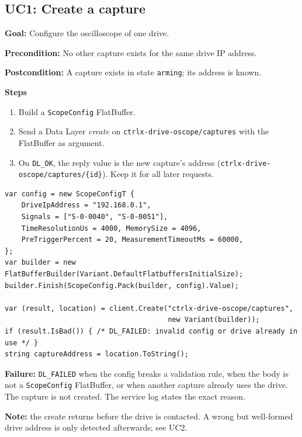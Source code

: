 \documentclass[11pt,a4paper]{article}
\newcommand{\dl}[1]{\texttt{#1}}
\newcommand{\capsroot}{\dl{ctrlx-drive-oscope/captures}}
\newcommand{\res}[1]{\texttt{#1}}
\newenvironment{usecase}[1]
  {\subsection{#1}}
  {}
\newcommand{\ucfield}[2]{\par\noindent\textbf{#1:} #2\par}
\begin{document}
\begin{usecase}{UC1: Create a capture}
\ucfield{Goal}{Configure the oscilloscope of one drive.}
\ucfield{Precondition}{No other capture exists for the same drive IP address.}
\ucfield{Postcondition}{A capture exists in state \dl{arming}; its address is known.}

\textbf{Steps}
\begin{enumerate}[nosep]
  \item Build a \dl{ScopeConfig} FlatBuffer.
  \item Send a Data Layer \emph{create} on \capsroot{} with the FlatBuffer as argument.
  \item On \res{DL\_OK}, the reply value is the new capture's address
        (\dl{ctrlx-drive-oscope/captures/\{id\}}). Keep it for all later requests.
\end{enumerate}

\begin{lstlisting}[language={[Sharp]C}]
var config = new ScopeConfigT {
    DriveIpAddress = "192.168.0.1",
    Signals = ["S-0-0040", "S-0-0051"],
    TimeResolutionUs = 4000, MemorySize = 4096,
    PreTriggerPercent = 20, MeasurementTimeoutMs = 60000,
};
var builder = new FlatBufferBuilder(Variant.DefaultFlatbuffersInitialSize);
builder.Finish(ScopeConfig.Pack(builder, config).Value);

var (result, location) = client.Create("ctrlx-drive-oscope/captures",
                                       new Variant(builder));
if (result.IsBad()) { /* DL_FAILED: invalid config or drive already in use */ }
string captureAddress = location.ToString();
\end{lstlisting}

\textbf{Failure:} \res{DL\_FAILED} when the config breaks a validation rule,
when the body is not a \dl{ScopeConfig} FlatBuffer, or when another capture
already uses the drive. The capture is not created. The service log states the
exact reason.

\textbf{Note:} the create returns before the drive is contacted. A wrong but
well-formed drive address is only detected afterwards; see UC2.
\end{usecase}
\end{document}
